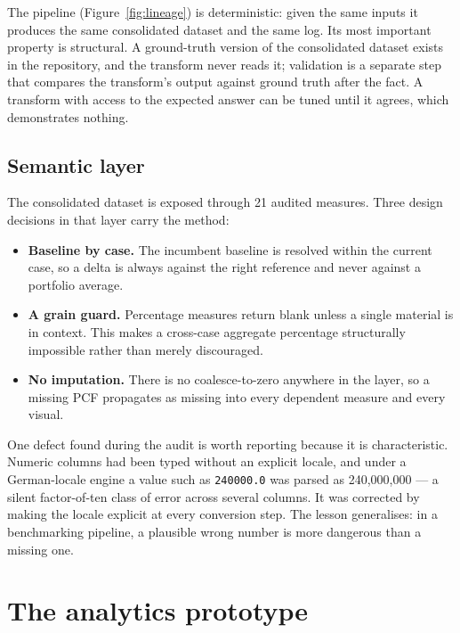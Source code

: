 \documentclass[10pt,twocolumn,a4paper]{article}
\begin{document}
The pipeline (Figure~\ref{fig:lineage}) is deterministic: given the same inputs it
produces the same consolidated dataset and the same log. Its most important
property is structural. A ground-truth version of the consolidated dataset exists
in the repository, and the transform never reads it; validation is a separate step
that compares the transform's output against ground truth after the fact. A
transform with access to the expected answer can be tuned until it agrees, which
demonstrates nothing.

\subsection{Semantic layer}

The consolidated dataset is exposed through 21 audited measures. Three design
decisions in that layer carry the method:

\begin{itemize}
  \item \textbf{Baseline by case.} The incumbent baseline is resolved within the
        current case, so a delta is always against the right reference and never
        against a portfolio average.
  \item \textbf{A grain guard.} Percentage measures return blank unless a single
        material is in context. This makes a cross-case aggregate percentage
        structurally impossible rather than merely discouraged.
  \item \textbf{No imputation.} There is no coalesce-to-zero anywhere in the
        layer, so a missing PCF propagates as missing into every dependent
        measure and every visual.
\end{itemize}

One defect found during the audit is worth reporting because it is
characteristic. Numeric columns had been typed without an explicit locale, and
under a German-locale engine a value such as \texttt{240000.0} was parsed as
240{,}000{,}000 --- a silent factor-of-ten class of error across several columns.
It was corrected by making the locale explicit at every conversion step. The
lesson generalises: in a benchmarking pipeline, a plausible wrong number is more
dangerous than a missing one.

\section{The analytics prototype}
\label{sec:prototype}
\end{document}
